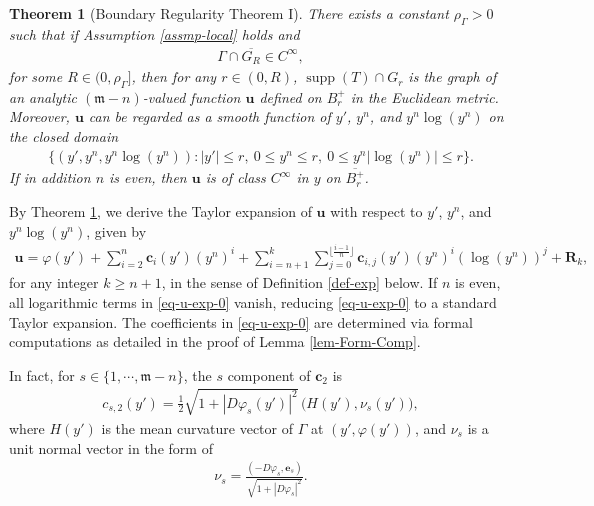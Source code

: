 \documentclass[11pt,reqno]{amsart}
\newcommand{\fm}{\mathfrak{m}}
\renewcommand{\leq}{\leqslant}
\renewcommand{\geq}{\geqslant}
\newtheorem{theorem}{Theorem}[section]
\theoremstyle{definition}
\numberwithin{equation}{section}
\begin{document}
\begin{theorem}[Boundary Regularity Theorem I]\label{thm-BRT1}
There exists a constant $\rho_\Gamma>0$ such that if Assumption \ref{assmp-local} holds and
\begin{align}
\Gamma \cap \overline{G_R} \in C^{\infty},
\end{align}
for some $R\in (0, \rho_\Gamma]$, then for any $r\in (0, R)$, $\operatorname{supp}(T) \cap G_r$ is the graph of an analytic $(\fm-n)$-valued function $\mathbf{u}$ defined on $B^+_r$ in the Euclidean metric. Moreover, $\mathbf{u}$ can be regarded as a smooth function of $y'$, $y^n$, and $y^n\log(y^n)$ on the closed domain
\begin{align}
\bigl\{(y', y^n, y^n\log(y^n)): |y'|\leq r,\ 0\leq y^n \leq r,\ 0\leq  y^n|\log(y^n)|\leq  r\bigr\}.
\end{align}
If in addition $n$ is even, then $\mathbf{u}$ is of class $C^\infty$ in $y$ on $\overline{B^+_r}$.
\end{theorem}
By Theorem \ref{thm-BRT1}, we derive the Taylor expansion of $\mathbf{u}$ with respect to $y'$, $y^n$, and $y^n\log(y^n)$, given by
\begin{align}\label{eq-u-exp-0}
    \mathbf{u} = \varphi(y') +\sum_{i=2}^{n}\mathbf{c}_i(y')(y^n)^i +\sum_{i=n+1}^k\sum_{j=0}^{\lfloor \frac{i-1}{n}\rfloor} \mathbf{c}_{i,j}(y')(y^n)^i(\log(y^n))^j +\mathbf{R}_k,
\end{align}
for any integer $k\geq n+1$, in the sense of Definition \ref{def-exp} below. If $n$ is even, all logarithmic terms in \eqref{eq-u-exp-0} vanish, reducing \eqref{eq-u-exp-0} to a standard Taylor expansion. The coefficients in \eqref{eq-u-exp-0} are determined via formal computations as detailed in the proof of Lemma \ref{lem-Form-Comp}.

In fact, for $s \in \{1,\cdots, \fm-n\}$, the $s$ component of $\mathbf{c}_2$ is
\begin{align}
    c_{s,2}(y') = \frac{1}{2}\sqrt{1+|D\varphi_s(y')|^2} \, \big(H(y'), \nu_s(y')\big),
\end{align}
where $H(y')$ is the mean curvature vector of $\Gamma$ at $(y',\varphi(y'))$, and $\nu_s$ is a unit normal vector in the form of
\begin{align}
    \nu_s = \frac{(-D\varphi_s, \mathbf{e}_s)}{\sqrt{1+|D \varphi_s|^2}}.
\end{align}
\end{document}
